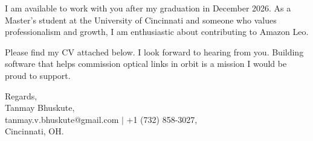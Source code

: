 \documentclass[11pt]{letter}
\begin{document}
\begin{letter}{}
I am available to work with you after my graduation in December 2026. As a Master's student at the University of Cincinnati and someone who values professionalism and growth, I am enthusiastic about contributing to Amazon Leo.

Please find my CV attached below. I look forward to hearing from you. Building software that helps commission optical links in orbit is a mission I would be proud to support.

{\setlength{\parskip}{0pt}
Regards,\\
Tanmay Bhuskute,\\
tanmay.v.bhuskute@gmail.com $\mid$ +1 (732) 858-3027,\\
Cincinnati, OH.
}

\end{letter}
\end{document}
